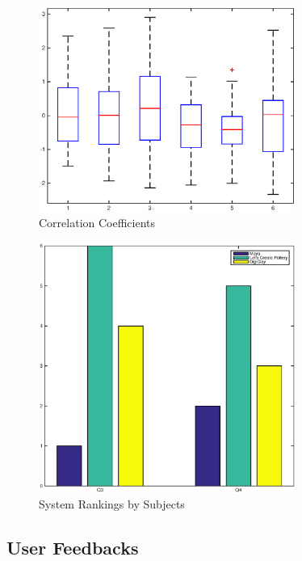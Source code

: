 \begin{figure}
  \includegraphics[width=0.75\textwidth]{cc.eps}
\caption{Correlation Coefficients}
\label{fig:8}       %
\end{figure}

\begin{figure}
  \includegraphics[width=0.75\textwidth]{fig8.eps}
\caption{System Rankings by Subjects}
\label{fig:9}       %
\end{figure}

\subsection{User Feedbacks}
\label{sec:6.5}

